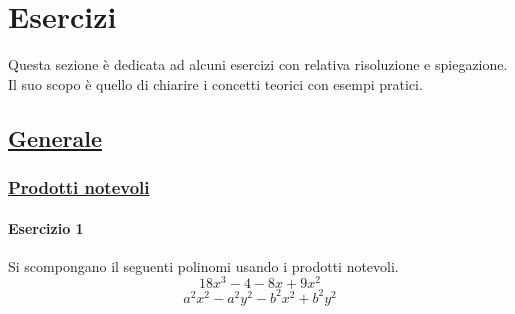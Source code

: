 
\section{Esercizi}
Questa sezione è dedicata ad alcuni esercizi con relativa risoluzione e spiegazione. Il suo scopo
è quello di chiarire i concetti teorici con esempi pratici.

\subsection*{\hyperref[sec:gen]{Generale}}\label{ex:generale}

\subsubsection*{\hyperref[subsec:gen:prodnot]{Prodotti notevoli}}
\paragraph{Esercizio 1}
Si scompongano il seguenti polinomi usando i prodotti notevoli.
\begin{equation}\label{eq:ex:prodnot1}
  18x^3 - 4 -8x + 9x^2
\end{equation}
\begin{equation}\label{eq:ex:prodnot2}
  a^2x^2 - a^2y^2 - b^2x^2 + b^2y^2
\end{equation}
\setcounter{equation}{0}
\divisor

